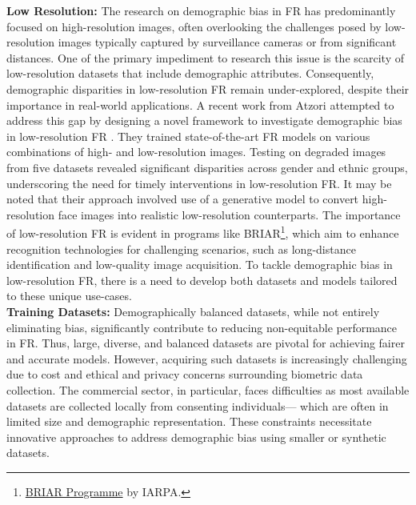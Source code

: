 
\noindent\textbf{Low Resolution:}
The research on demographic bias in FR has predominantly focused on
high-resolution images, often overlooking the challenges posed by low-resolution
images typically captured by surveillance cameras or from significant distances.
One of the primary impediment to research this issue is the scarcity of
low-resolution datasets that include demographic attributes. Consequently,
demographic disparities in low-resolution FR remain under-explored, despite
their importance in real-world applications.
%
A recent work from Atzori \etal attempted to address this gap by designing a
novel framework to investigate demographic bias in low-resolution FR
\cite{atzori2023demographic}. They trained state-of-the-art FR models on various
combinations of high- and low-resolution images. Testing on degraded images from
five datasets revealed significant disparities across gender and ethnic groups,
underscoring the need for timely interventions in low-resolution FR. It may be
noted that their approach involved use of a generative model to convert
high-resolution face images into realistic low-resolution counterparts.
%
The importance of low-resolution FR is evident in programs like
BRIAR\footnote{\href{https://www.iarpa.gov/research-programs/briar}{BRIAR
Programme} by IARPA.}, which aim to enhance recognition technologies for
challenging scenarios, such as long-distance identification and low-quality
image acquisition. To tackle demographic bias in low-resolution FR, there is a
need to develop both datasets and models tailored to these unique use-cases.\\

\noindent\textbf{Training Datasets:}
Demographically balanced datasets, while not entirely eliminating bias,
significantly contribute to reducing non-equitable performance in FR. Thus,
large, diverse, and balanced datasets are pivotal for achieving fairer and
accurate models. However, acquiring such datasets is increasingly challenging
due to cost and ethical and privacy concerns surrounding biometric data
collection. The commercial sector, in particular, faces difficulties as most
available datasets are collected locally from consenting individuals--- which
are often in limited size and demographic representation. These constraints
necessitate innovative approaches to address demographic bias using smaller or
synthetic datasets.
%

